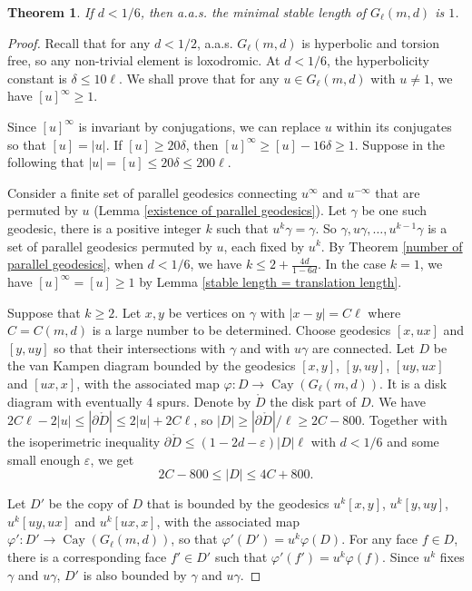 \documentclass[a4paper]{article}
\DeclareMathOperator{\Cay}{Cay}
\newtheorem{thm}{Theorem}[section]
\theoremstyle{remark}
\begin{document}
\begin{thm} \label{inj rad at 1/6} If $d<1/6$, then a.a.s. the minimal stable length of $G_\ell(m,d)$ is $1$.
\end{thm}
\begin{proof}
    Recall that for any $d<1/2$, a.a.s. $G_\ell(m,d)$ is hyperbolic and torsion free, so any non-trivial element is loxodromic. At $d<1/6$, the hyperbolicity constant is $\delta\leq 10\ell$. We shall prove that for any $u\in G_\ell(m,d)$ with $u\neq 1$, we have $[u]^\infty\geq 1$. 
    
    Since $[u]^\infty$ is invariant by conjugations, we can replace $u$ within its conjugates so that $[u] = |u|$. If $[u]\geq 20\delta$, then $[u]^\infty\geq [u]-16\delta\geq 1$. Suppose in the following that $|u| = [u]\leq 20\delta\leq 200\ell$. 
    
    Consider a finite set of parallel geodesics connecting $u^\infty$ and $u^{-\infty}$ that are permuted by $u$ (Lemma \ref{existence of parallel geodesics}). Let $\gamma$ be one such geodesic, there is a positive integer $k$ such that $u^k\gamma = \gamma$. So $\gamma, u\gamma,\dots, u^{k-1}\gamma$ is a set of parallel geodesics permuted by $u$, each fixed by $u^k$. By Theorem \ref{number of parallel geodesics}, when $d<1/6$, we have $k\leq 2+\frac{4d}{1-6d}$. In the case $k=1$, we have $[u]^\infty = [u] \geq 1$ by Lemma \ref{stable length = translation length}.
    
    Suppose that $k\geq 2$. Let $x,y$ be vertices on $\gamma$ with $|x-y| = C\ell$ where $C = C(m,d)$ is a large number to be determined. Choose geodesics $[x,ux]$ and $[y,uy]$ so that their intersections with $\gamma$ and with $u\gamma$ are connected. Let $D$ be the van Kampen diagram bounded by the geodesics $[x,y]$, $[y,uy]$, $[uy,ux]$ and $[ux,x]$, with the associated map $\varphi : D\to \Cay(G_\ell(m,d))$. It is a disk diagram with eventually $4$ spurs. Denote by $\mathring D$ the disk part of $D$. We have $2C\ell-2|u|\leq |\partial \mathring D|\leq 2|u|+2C\ell$, so $|D|\geq |\partial \mathring D|/\ell\geq 2C-800$. Together with the isoperimetric inequality $\partial \mathring D\leq (1-2d-\varepsilon)|D|\ell$ with $d<1/6$ and some small enough $\varepsilon$, we get    
    \[2C-800\leq |D|\leq 4C+800.\]
    
    Let $D'$ be the copy of $D$ that is bounded by the geodesics $u^k[x,y]$, $u^k[y,uy]$, $u^k[uy,ux]$ and $u^k[ux,x]$, with the associated map $\varphi': D'\to \Cay(G_\ell(m,d))$, so that $\varphi'(D') = u^k \varphi(D)$. For any face $f\in D$, there is a corresponding face $f'\in D'$ such that $\varphi'(f') = u^k \varphi (f)$. Since $u^k$ fixes $\gamma$ and $u\gamma$, $D'$ is also bounded by $\gamma$ and $u\gamma$.


\end{proof}
\end{document}
